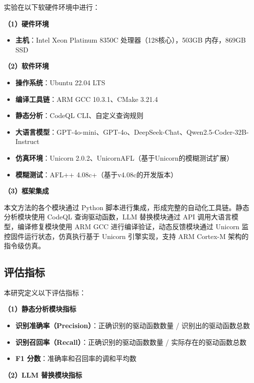 实验在以下软硬件环境中进行：

\textbf{（1）硬件环境}

\begin{itemize}
    \item \textbf{主机}：Intel Xeon Platinum 8350C 处理器（128核心），503GB 内存，869GB SSD
\end{itemize}

\textbf{（2）软件环境}

\begin{itemize}
    \item \textbf{操作系统}：Ubuntu 22.04 LTS
    \item \textbf{编译工具链}：ARM GCC 10.3.1、CMake 3.21.4
    \item \textbf{静态分析}：CodeQL CLI、自定义查询规则
    \item \textbf{大语言模型}：GPT-4o-mini、GPT-4o、DeepSeek-Chat、Qwen2.5-Coder-32B-Instruct
    \item \textbf{仿真环境}：Unicorn 2.0.2、UnicornAFL（基于Unicorn的模糊测试扩展）
    \item \textbf{模糊测试}：AFL++ 4.08c+（基于v4.08c的开发版本）
\end{itemize}

\textbf{（3）框架集成}

本文方法的各个模块通过 Python 脚本进行集成，形成完整的自动化工具链。静态分析模块使用 CodeQL 查询驱动函数，LLM 替换模块通过 API 调用大语言模型，编译修复模块使用 ARM GCC 进行编译验证，动态反馈模块通过 Unicorn 监控固件运行状态，仿真执行基于 Unicorn 引擎实现，支持 ARM Cortex-M 架构的指令级仿真。

\subsection{评估指标}

本研究定义以下评估指标：

\textbf{（1）静态分析模块指标}

\begin{itemize}
    \item \textbf{识别准确率（Precision）}：正确识别的驱动函数数量 / 识别出的驱动函数总数
    \item \textbf{识别召回率（Recall）}：正确识别的驱动函数数量 / 实际存在的驱动函数总数
    \item \textbf{F1 分数}：准确率和召回率的调和平均数
\end{itemize}

\textbf{（2）LLM 替换模块指标}

